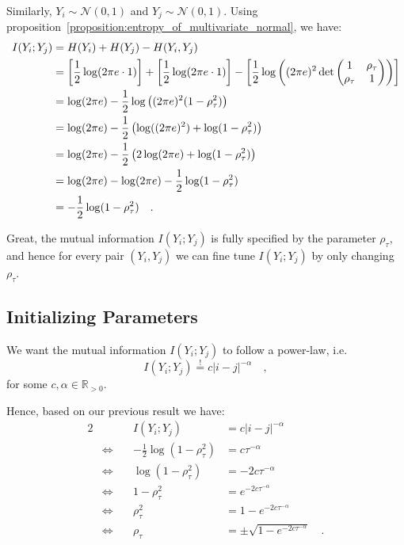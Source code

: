 \documentclass[../../main.tex]{subfiles}
\begin{document}
Similarly, $Y_i \sim \mathcal{N}(0, 1)$ and $Y_j \sim \mathcal{N}(0, 1)$. Using proposition~\ref{proposition:entropy_of_multivariate_normal}, we have:
\begin{align}
    I(Y_i; Y_j) &= H(Y_i) + H(Y_j) - H(Y_i, Y_j) \notag \\
    &= \left[ \frac{1}{2} \log(2\pi e \cdot 1) \right] + \left[ \frac{1}{2} \log(2\pi e \cdot 1) \right] - \left[ \frac{1}{2} \log\left( (2\pi e)^2 \det\begin{pmatrix*} 1 & \rho_\tau \\ \rho_\tau & 1 \end{pmatrix*} \right) \right] \notag \\
    &= \log(2\pi e) - \frac{1}{2} \log\left( (2\pi e)^2 (1-\rho_\tau^2) \right) \notag \\
    &= \log(2\pi e) - \frac{1}{2} \left( \log((2\pi e)^2) + \log(1-\rho_\tau^2) \right) \notag \\
    &= \log(2\pi e) - \frac{1}{2} \left( 2\log(2\pi e) + \log(1-\rho_\tau^2) \right) \notag \\
    &= \log(2\pi e) - \log(2\pi e) - \frac{1}{2}\log(1-\rho_\tau^2) \notag \\
    &= -\frac{1}{2}\log(1-\rho_\tau^2) \label{eq:gauss_mutual_information} \quad .
\end{align}

Great, the mutual information $I(Y_i; Y_j)$ is fully specified by the parameter $\rho_\tau$, and hence for every pair $(Y_i, Y_j)$ we can fine tune $I(Y_i; Y_j)$ by only changing $\rho_\tau$.

\subsection{Initializing Parameters}
We want the mutual information $I(Y_i; Y_j)$ to follow a power-law, i.e.
\[
    I(Y_i; Y_j) \overset{!}{=} c |i-j|^{-\alpha} \quad ,
\]
for some $c, \alpha \in \mathbb{R}_{>0}$.

Hence, based on our previous result we have:
\begin{alignat*}{2}
    && I(Y_i; Y_j) &= c |i-j|^{-\alpha} \\
    & \iff \quad & -\frac{1}{2}\log(1-\rho_\tau^2) &= c \tau^{-\alpha} \\
    & \iff \quad & \log(1-\rho_\tau^2) &= -2c \tau^{-\alpha} \\
    & \iff \quad & 1-\rho_\tau^2 &= e^{-2c \tau^{-\alpha}} \\
    & \iff \quad & \rho_\tau^2 &= 1 - e^{-2c \tau^{-\alpha}} \\
    & \iff \quad & \rho_\tau &= \pm \sqrt{1 - e^{-2c \tau^{-\alpha}}} \quad . \\
\end{alignat*}
\end{document}
